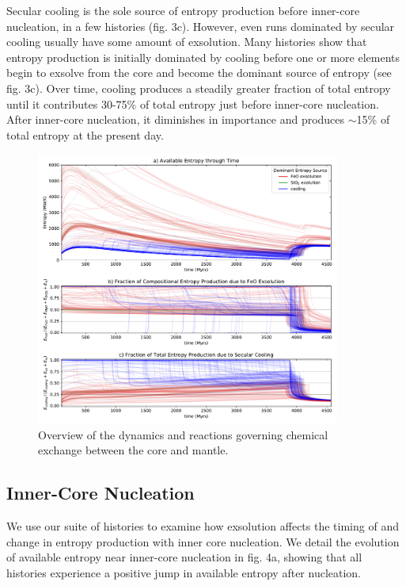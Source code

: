 \documentclass[]{article}
\begin{document}
	Secular cooling is the sole source of entropy production before inner-core nucleation, in a few histories (fig. 3c). However, even runs dominated by secular cooling usually have some amount of exsolution. Many histories show that entropy production is initially dominated by cooling before one or more elements begin to exsolve from the core and become the dominant source of entropy (see fig. 3c). Over time, cooling produces a steadily greater fraction of total entropy until it contributes 30-75\% of total entropy just before inner-core nucleation. After inner-core nucleation, it diminishes in importance and produces $\sim$15\% of total entropy at the present day.
	\begin{figure}\centering
		\includegraphics[width=10cm]{./figures/figure3.pdf}
		\caption{Overview of the dynamics and reactions governing chemical exchange between the core and mantle.}
		\label{fig3}
	\end{figure}
	
	\subsection{Inner-Core Nucleation}\label{inner-core-nucleation}
	We use our suite of histories to examine how exsolution affects the timing of and change in entropy production with inner core nucleation. We detail the evolution of available entropy near inner-core nucleation in fig. 4a, showing that all histories experience a positive jump in available entropy after nucleation. 
	
\end{document}
